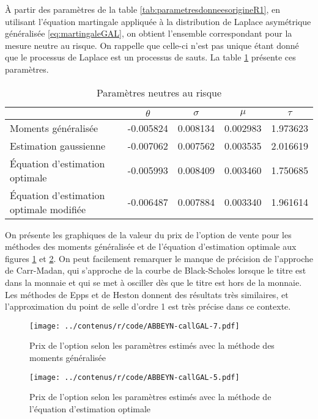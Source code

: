 À partir des paramètres de la table
\ref{tab:parametresdonneesorigineR1}, en utilisant l'équation
martingale appliquée à la distribution de Laplace asymétrique
généralisée \eqref{eq:martingaleGAL}, on obtient l'ensemble
correspondant pour la mesure neutre au risque. On rappelle que
celle-ci n'est pas unique étant donné que le processus de Laplace est
un processus de sauts. La table \ref{tab:paramrisqueneutreR1} présente
ces paramètres.
\begin{table}[!ht]
  \centering
  \begin{tabular}{lcccc}
    \hline
    & $\theta$ & $\sigma$ & $\mu$ & $\tau$ \\ 
    \hline
    Moments généralisée & -0.005824 & 0.008134 & 0.002983 & 1.973623 \\ 
    Estimation gaussienne & -0.007062 & 0.007562 & 0.003535 & 2.016619 \\ 
    Équation d'estimation optimale & -0.005993 & 0.008409 & 0.003460 & 1.750685 \\ 
    Équation d'estimation optimale modifiée & -0.006487 & 0.007884 & 0.003340 & 1.961614 \\ 
    \hline
  \end{tabular}
  \caption{Paramètres neutres au risque}
  \label{tab:paramrisqueneutreR1}
\end{table}

On présente les graphiques de la valeur du prix de l'option de vente
pour les méthodes des moments généralisée et de l'équation d'estimation
optimale aux figures \ref{fig:prix1R1-1} et \ref{fig:prix1R1-3}.  On
peut facilement remarquer le manque de précision de l'approche de
Carr-Madan, qui s'approche de la courbe de Black-Scholes lorsque le
titre est dans la monnaie et qui se met à osciller dès que le titre
est hors de la monnaie. Les méthodes de Epps et de Heston donnent des
résultats très similaires, et l'approximation du point de selle
d'ordre 1 est très précise dans ce contexte.
\begin{figure}[!ht]
  \centering
  \texttt{[image: ../contenus/r/code/ABBEYN-callGAL-7.pdf]}
  \caption{Prix de l'option selon les paramètres estimés avec la
    méthode des moments généralisée}
  \label{fig:prix1R1-1}
\end{figure}

\begin{figure}[!ht]
  \centering
  \texttt{[image: ../contenus/r/code/ABBEYN-callGAL-5.pdf]}
  \caption{Prix de l'option selon les paramètres estimés avec la
    méthode de l'équation d'estimation optimale}
  \label{fig:prix1R1-3}
\end{figure}

